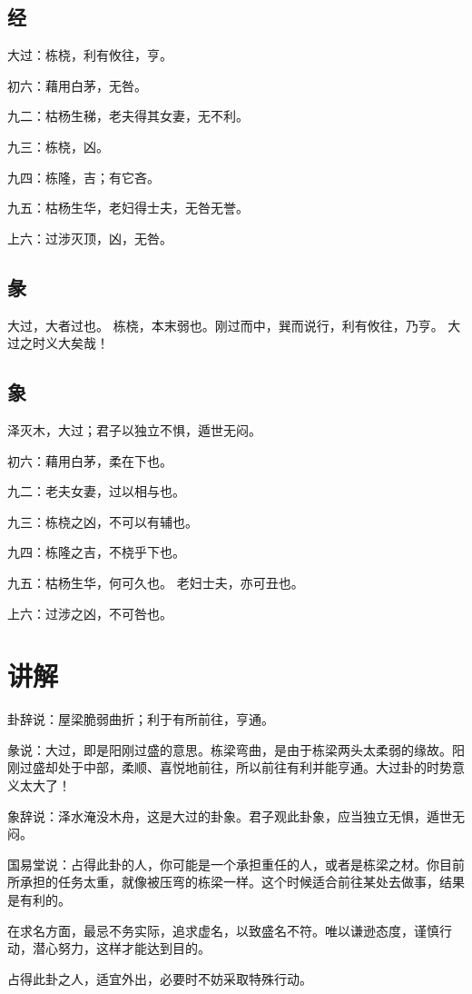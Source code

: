 \documentclass[12pt,oneside]{book}
\begin{document}
\subsection{经}
大过：栋桡，利有攸往，亨。

初六：藉用白茅，无咎。

九二：枯杨生稊，老夫得其女妻，无不利。

九三：栋桡，凶。

九四：栋隆，吉；有它吝。

九五：枯杨生华，老妇得士夫，无咎无誉。

上六：过涉灭顶，凶，无咎。

\subsection{彖}
大过，大者过也。 栋桡，本末弱也。刚过而中，巽而说行，利有攸往，乃亨。 大过之时义大矣哉！

\subsection{象}
泽灭木，大过；君子以独立不惧，遁世无闷。

初六：藉用白茅，柔在下也。

九二：老夫女妻，过以相与也。

九三：栋桡之凶，不可以有辅也。

九四：栋隆之吉，不桡乎下也。

九五：枯杨生华，何可久也。 老妇士夫，亦可丑也。

上六：过涉之凶，不可咎也。

\section{讲解}
卦辞说：屋梁脆弱曲折；利于有所前往，亨通。

彖说：大过，即是阳刚过盛的意思。栋梁弯曲，是由于栋梁两头太柔弱的缘故。阳刚过盛却处于中部，柔顺、喜悦地前往，所以前往有利并能亨通。大过卦的时势意义太大了！

象辞说：泽水淹没木舟，这是大过的卦象。君子观此卦象，应当独立无惧，遁世无闷。

国易堂说：占得此卦的人，你可能是一个承担重任的人，或者是栋梁之材。你目前所承担的任务太重，就像被压弯的栋梁一样。这个时候适合前往某处去做事，结果是有利的。

在求名方面，最忌不务实际，追求虚名，以致盛名不符。唯以谦逊态度，谨慎行动，潜心努力，这样才能达到目的。

占得此卦之人，适宜外出，必要时不妨采取特殊行动。
\end{document}
